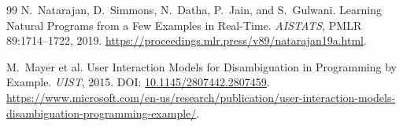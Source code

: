 \documentclass[11pt,a4paper]{article}
\theoremstyle{definition}
\theoremstyle{remark}
\begin{document}
\begin{thebibliography}{99}
N.~Natarajan, D.~Simmons, N.~Datha, P.~Jain, and S.~Gulwani.
Learning Natural Programs from a Few Examples in Real-Time.
\emph{AISTATS}, PMLR 89:1714--1722, 2019.
\url{https://proceedings.mlr.press/v89/natarajan19a.html}.

M.~Mayer et al. User Interaction Models for Disambiguation in Programming
by Example. \emph{UIST}, 2015.
DOI: \href{https://doi.org/10.1145/2807442.2807459}{10.1145/2807442.2807459}.
\url{https://www.microsoft.com/en-us/research/publication/user-interaction-models-disambiguation-programming-example/}.

\end{thebibliography}
\end{document}
